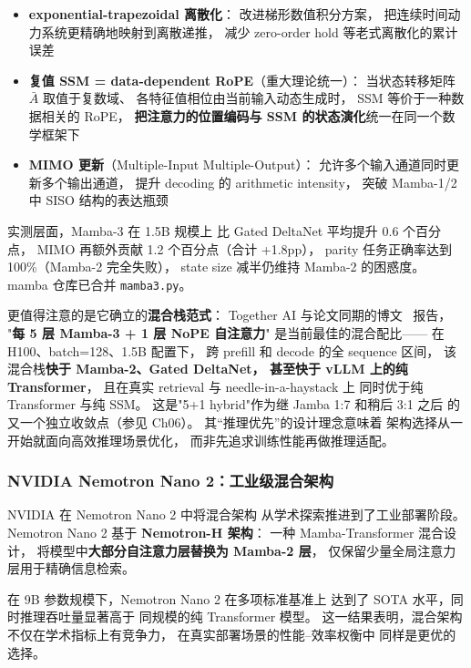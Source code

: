 \begin{itemize}[noitemsep]
  \item \textbf{exponential-trapezoidal 离散化}：
        改进梯形数值积分方案，
        把连续时间动力系统更精确地映射到离散递推，
        减少 zero-order hold 等老式离散化的累计误差
  \item \textbf{复值 SSM = data-dependent RoPE}（重大理论统一）：
        当状态转移矩阵 $\bar{A}$ 取值于复数域、
        各特征值相位由当前输入动态生成时，
        SSM 等价于一种数据相关的 RoPE，
        \textbf{把注意力的位置编码与 SSM 的状态演化}统一在同一个数学框架下
  \item \textbf{MIMO 更新}（Multiple-Input Multiple-Output）：
        允许多个输入通道同时更新多个输出通道，
        提升 decoding 的 arithmetic intensity，
        突破 Mamba-1/2 中 SISO 结构的表达瓶颈
\end{itemize}

实测层面，Mamba-3 在 1.5B 规模上
比 Gated DeltaNet 平均提升 0.6 个百分点，
MIMO 再额外贡献 1.2 个百分点（合计 +1.8pp），
parity 任务正确率达到 100\%（Mamba-2 完全失败），
state size 减半仍维持 Mamba-2 的困惑度。
mamba 仓库已合并 \texttt{mamba3.py}。

更值得注意的是它确立的\textbf{混合栈范式}：
Together AI 与论文同期的博文~\cite{mamba3hybridtogether2026} 报告，
"\textbf{每 5 层 Mamba-3 + 1 层 NoPE 自注意力}"
是当前最佳的混合配比——
在 H100、batch=128、1.5B 配置下，
跨 prefill 和 decode 的全 sequence 区间，
该混合栈\textbf{快于 Mamba-2、Gated DeltaNet，
甚至快于 vLLM 上的纯 Transformer}，
且在真实 retrieval 与 needle-in-a-haystack 上
同时优于纯 Transformer 与纯 SSM。
这是"5+1 hybrid"作为继 Jamba 1:7 和稍后 3:1 之后
的又一个独立收敛点（参见 Ch06）。
其“推理优先”的设计理念意味着
架构选择从一开始就面向高效推理场景优化，
而非先追求训练性能再做推理适配。

\subsubsection{NVIDIA Nemotron Nano 2：工业级混合架构}

NVIDIA 在 Nemotron Nano 2 中将混合架构
从学术探索推进到了工业部署阶段。
Nemotron Nano 2 基于 \textbf{Nemotron-H 架构}：
一种 Mamba-Transformer 混合设计，
将模型中\textbf{大部分自注意力层替换为 Mamba-2 层}，
仅保留少量全局注意力层用于精确信息检索。

在 9B 参数规模下，Nemotron Nano 2 在多项标准基准上
达到了 SOTA 水平，同时推理吞吐量显著高于
同规模的纯 Transformer 模型。
这一结果表明，混合架构不仅在学术指标上有竞争力，
在真实部署场景的性能--效率权衡中
同样是更优的选择。

